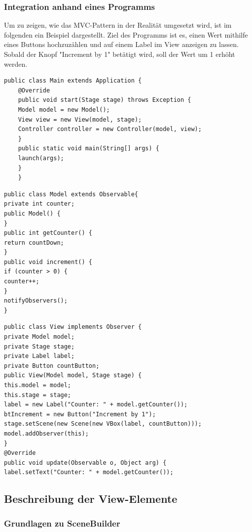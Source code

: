 \subsubsection{Integration anhand eines Programms}
Um zu zeigen, wie das MVC-Pattern in der Realität umgesetzt wird, ist im folgenden ein Beispiel dargestellt. Ziel des Programms ist es, einen Wert mithilfe eines Buttons hochzuzählen und auf einem Label im View anzeigen zu lassen.
Sobald der Knopf "Increment by 1" betätigt wird, soll der Wert um 1 erhöht werden.
\begin{lstlisting}[style=java,caption=Java Codebeispiel,label=Hauptprogramm]
    public class Main extends Application {
    @Override
    public void start(Stage stage) throws Exception {
    Model model = new Model();
    View view = new View(model, stage);
    Controller controller = new Controller(model, view);
    }
    public static void main(String[] args) {
    launch(args);
    }
    }
\end{lstlisting}


\begin{lstlisting}[style=java,caption=Java Codebeispiel,label=Model]
public class Model extends Observable{
private int counter;
public Model() {
}
public int getCounter() {
return countDown;
}
public void increment() {
if (counter > 0) {
counter++;
}
notifyObservers();
}
\end{lstlisting}

\begin{lstlisting}[style=java,caption=Die Klasse View,label=View]
public class View implements Observer {
private Model model;
private Stage stage;
private Label label;
private Button countButton;
public View(Model model, Stage stage) {
this.model = model;
this.stage = stage;
label = new Label("Counter: " + model.getCounter());
btIncrement = new Button("Increment by 1");
stage.setScene(new Scene(new VBox(label, countButton)));
model.addObserver(this);
}
@Override
public void update(Observable o, Object arg) {
label.setText("Counter: " + model.getCounter());
\end{lstlisting}



\subsection{Beschreibung der View-Elemente}
\subsubsection{Grundlagen zu SceneBuilder}

